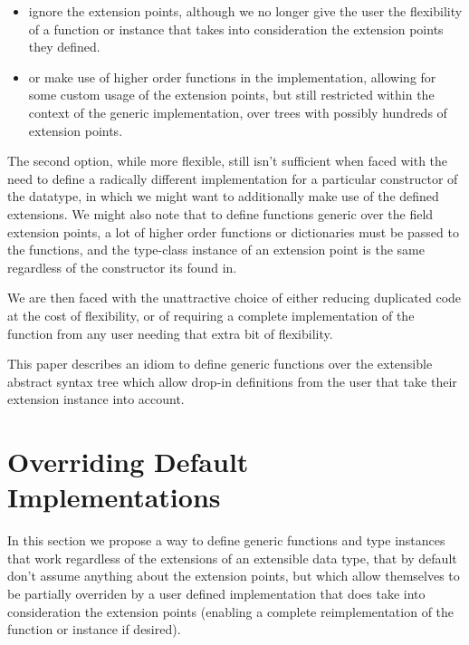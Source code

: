 \documentclass{article}
\begin{document}
\begin{itemize}
    \item ignore the extension points, although we no longer give the user the
        flexibility of a function or instance that takes into consideration the
        extension points they defined.

    \item or make use of higher order functions in the implementation, allowing for some
        custom usage of the extension points, but still restricted within the
        context of the generic implementation, over trees with possibly hundreds
        of extension points.
\end{itemize}

The second option, while more flexible, still isn't sufficient when faced with
the need to define a radically different implementation for a particular
constructor of the datatype, in which we might want to additionally make use of
the defined extensions. We might also note that to define functions generic over
the field extension points, a lot of higher order functions or dictionaries must
be passed to the functions, and the type-class instance of an extension point is
the same regardless of the constructor its found in.

We are then faced with the unattractive choice of either reducing duplicated
code at the cost of flexibility, or of requiring a complete implementation of the
function from any user needing that extra bit of flexibility.

This paper describes an idiom to define generic functions over the extensible
abstract syntax tree which allow drop-in definitions from the user that take
their extension instance into account.


\section{Overriding Default Implementations}

In this section we propose a way to define generic functions and type instances
that work regardless of the extensions of an extensible data type, that by
default don't assume anything about the extension points, but which allow
themselves to be partially overriden by a user defined implementation that does
take into consideration the extension points (enabling a complete
reimplementation of the function or instance if desired).
\end{document}
